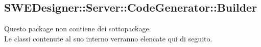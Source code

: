 \documentclass[../DefinizioneDiProdotto.tex]{subfiles}
\begin{document}
			
			
			
			\subsection{SWEDesigner::Server::CodeGenerator::Builder}
			Questo package non contiene dei sottopackage.\\
			Le classi contenute al suo interno verranno elencate qui di seguito.
			
\end{document}
